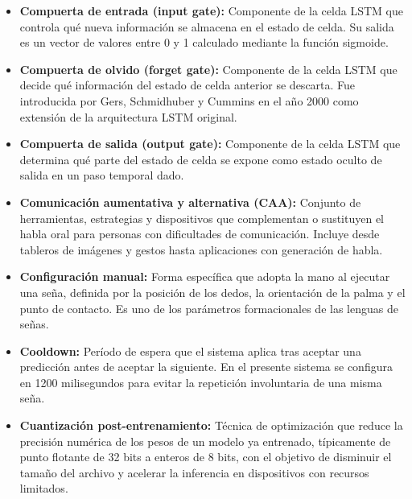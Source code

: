 \begin{itemize}
    \item[] \textbf{Compuerta de entrada (input gate):} Componente de la celda LSTM que controla qué nueva información se almacena en el estado de celda. Su salida es un vector de valores entre 0 y 1 calculado mediante la función sigmoide.\\

    \item[] \textbf{Compuerta de olvido (forget gate):} Componente de la celda LSTM que decide qué información del estado de celda anterior se descarta. Fue introducida por Gers, Schmidhuber y Cummins en el año 2000 como extensión de la arquitectura LSTM original.\\

    \item[] \textbf{Compuerta de salida (output gate):} Componente de la celda LSTM que determina qué parte del estado de celda se expone como estado oculto de salida en un paso temporal dado.\\

    \item[] \textbf{Comunicación aumentativa y alternativa (CAA):} Conjunto de herramientas, estrategias y dispositivos que complementan o sustituyen el habla oral para personas con dificultades de comunicación. Incluye desde tableros de imágenes y gestos hasta aplicaciones con generación de habla.\\

    \item[] \textbf{Configuración manual:} Forma específica que adopta la mano al ejecutar una seña, definida por la posición de los dedos, la orientación de la palma y el punto de contacto. Es uno de los parámetros formacionales de las lenguas de señas.\\

    \item[] \textbf{Cooldown:} Período de espera que el sistema aplica tras aceptar una predicción antes de aceptar la siguiente. En el presente sistema se configura en 1200 milisegundos para evitar la repetición involuntaria de una misma seña.\\

    \item[] \textbf{Cuantización post-entrenamiento:} Técnica de optimización que reduce la precisión numérica de los pesos de un modelo ya entrenado, típicamente de punto flotante de 32 bits a enteros de 8 bits, con el objetivo de disminuir el tamaño del archivo y acelerar la inferencia en dispositivos con recursos limitados.\\


\end{itemize}
